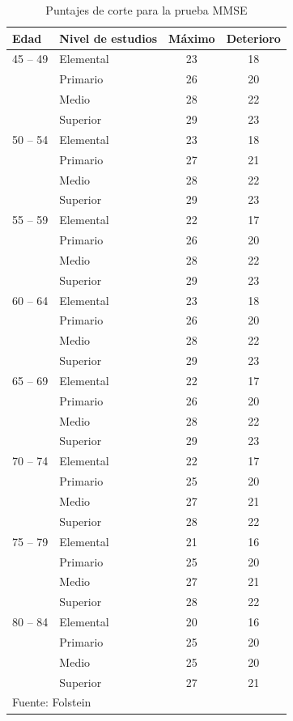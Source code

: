 \documentclass[12pt,letterpaper,draft]{book}
\begin{document}
\begin{table}
\centering
\caption{Puntajes de corte para la prueba MMSE}
\begin{tabular}{llcc}
\toprule
Edad & Nivel de estudios & Máximo & Deterioro \\
\midrule
45 -- 49&Elemental&23&18 \\
&Primario&26&20 \\
&Medio&28&22 \\
&Superior&29&23 \\
\midrule
50 -- 54&Elemental&23&18 \\
&Primario&27&21 \\
&Medio&28&22 \\
&Superior&29&23 \\
\midrule
55 -- 59&Elemental&22&17 \\
&Primario&26&20 \\
&Medio&28&22 \\
&Superior&29&23 \\
\midrule
60 -- 64&Elemental&23&18 \\
&Primario&26&20 \\
&Medio&28&22 \\
&Superior&29&23 \\
\midrule
65 -- 69&Elemental&22&17 \\
&Primario&26&20 \\
&Medio&28&22 \\
&Superior&29&23 \\
\midrule
70 -- 74&Elemental&22&17 \\
&Primario&25&20 \\
&Medio&27&21 \\
&Superior&28&22 \\
\midrule
75 -- 79&Elemental&21&16 \\
&Primario&25&20 \\
&Medio&27&21 \\
&Superior&28&22 \\
\midrule
80 -- 84&Elemental&20&16 \\
&Primario&25&20 \\
&Medio&25&20 \\
&Superior&27&21 \\
\bottomrule
\multicolumn{2}{l}{Fuente: Folstein \cite{crum93}}
\end{tabular}
\label{anexo:mmse}
\end{table}
\end{document}
